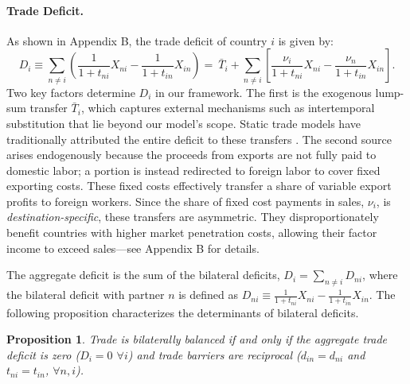 \documentclass[12pt]{article}
\newtheorem{prop}{Proposition}
\begin{document}
\paragraph{Trade Deficit.}
As shown in Appendix B, the trade deficit of country $i$ is given by:
\begin{equation}
\label{eq:trade_deficit}
D_{i}\equiv\sum_{n\neq i}\left(\frac{1}{1+t_{ni}}X_{ni}-\frac{1}{1+t_{in}}X_{in}\right)=\ \bar{T}_{i}+\sum_{n\neq i}\left[\frac{\nu_{i}}{1+t_{ni}}X_{ni}-\frac{\nu_{n}}{1+t_{in}}X_{in}\right].
\end{equation}
Two key factors determine $D_i$ in our framework. The first is the exogenous lump-sum transfer $\bar{T}_i$, which captures external mechanisms such as intertemporal substitution that lie beyond our model's scope. Static trade models have traditionally attributed the entire deficit to these transfers \citep{DEK}.  The second source arises endogenously because the proceeds from exports are not fully paid to domestic labor; a portion is instead redirected to foreign labor to cover fixed exporting costs. These fixed costs effectively transfer a share of variable export profits to foreign workers. Since the share of fixed cost payments in sales, $\nu_i$, is \textit{destination-specific}, these transfers are asymmetric. They disproportionately benefit countries with higher market penetration costs, allowing their factor income to exceed sales---see Appendix B for details.

The aggregate deficit is the sum of the bilateral deficits, $D_i = \sum_{n\neq i} D_{ni}$, where the bilateral deficit with partner $n$ is defined as $D_{ni} \equiv \frac{1}{1+t_{ni}}X_{ni}-\frac{1}{1+t_{in}}X_{in}$. The following proposition characterizes the determinants of bilateral deficits. %

\begin{prop}
\label{prop_2}
Trade is bilaterally balanced if and only if the aggregate trade deficit is zero ($D_i=0$  $\forall i$) and trade barriers are reciprocal ($d_{in}=d_{ni}$ and $t_{ni}=t_{in}$, $\forall n, i$).
\end{prop}
 
\end{document}
